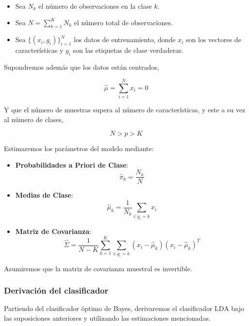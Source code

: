 \begin{itemize}
    \item Sea $N_k$ el número de observaciones en la clase $k$.
    \item Sea $N = \sum_{k=1}^K N_k$ el número total de observaciones.
    \item Sea $\{(x_i, g_i)\}_{i=1}^N$ los datos de entrenamiento, donde $x_i$ son los vectores de características y $g_i$ son las etiquetas de clase verdaderas.
\end{itemize}

Supondremos además que los datos están centrados,

\[
\hat{\mu} = \sum_{i=1}^N x_i = 0
\]

Y que el número de muestras supera al número de características, y este a su vez al número de clases,

\[
N > p > K
\]

Estimaremos los parámetros del modelo mediante:

\begin{itemize}
    \item \textbf{Probabilidades a Priori de Clase}:
    \[
    \hat{\pi}_k = \frac{N_k}{N}
    \]
    \item \textbf{Medias de Clase}:
    \[
    \hat{\mu}_k = \frac{1}{N_k} \sum_{i: g_i = k} x_i
    \]
    \item \textbf{Matriz de Covarianza}:
    \begin{equation}
    \hat{\Sigma} = \frac{1}{N - K} \sum_{k=1}^K \sum_{i: g_i = k} (x_i - \hat{\mu}_k)(x_i - \hat{\mu}_k)^T \label{eq:sample-covariance}
    \end{equation}
\end{itemize}

Asumiremos que la matriz de covarianza muestral es invertible.

\subsubsection{Derivación del clasificador}

Partiendo del clasificador óptimo de Bayes, derivaremos el clasificador LDA bajo las suposiciones anteriores y utilizando las estimaciones mencionadas.

